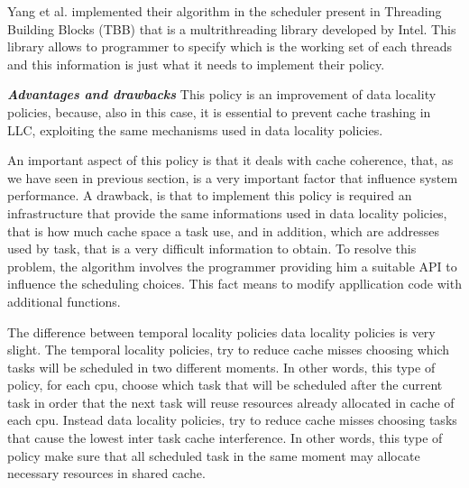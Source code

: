 \begin{description}
Yang et al. implemented their algorithm in the scheduler present in Threading Building Blocks (TBB) that is a multrithreading library developed by Intel. 
This library allows to programmer to specify which is the working set of each threads and this information is just what it needs to implement their policy. 


\textbf{\textit{Advantages and drawbacks}}
This policy is an improvement of data locality policies, because, also in this case, it is essential to prevent cache trashing in LLC,
exploiting the same mechanisms used in data locality policies.

An important aspect of this policy is that it deals with cache coherence, that, as we have seen in previous section, is a very important factor that 
influence system performance. A drawback, is that to implement this policy is required an infrastructure that provide the same informations used in 
data locality policies, that is how much cache space a task use, and in addition, which are addresses used by task, that is a very difficult information
to obtain. To resolve this problem, the algorithm involves the programmer providing him a suitable API to influence the scheduling choices. This fact 
means to modify appllication code with additional functions. 
\end{description}

The difference between temporal locality policies data locality policies is very slight. The temporal locality policies, try to reduce cache misses 
choosing which tasks will be scheduled in two different moments. In other words, this type of policy, for each cpu, choose which task that will be 
scheduled after the current task in order that the next task will reuse resources already allocated in cache of each cpu. Instead data locality policies, 
try to reduce cache misses choosing tasks that cause the lowest inter task cache interference. In other words, this type of policy make sure that all 
scheduled task in the same moment may allocate necessary resources in shared cache.

